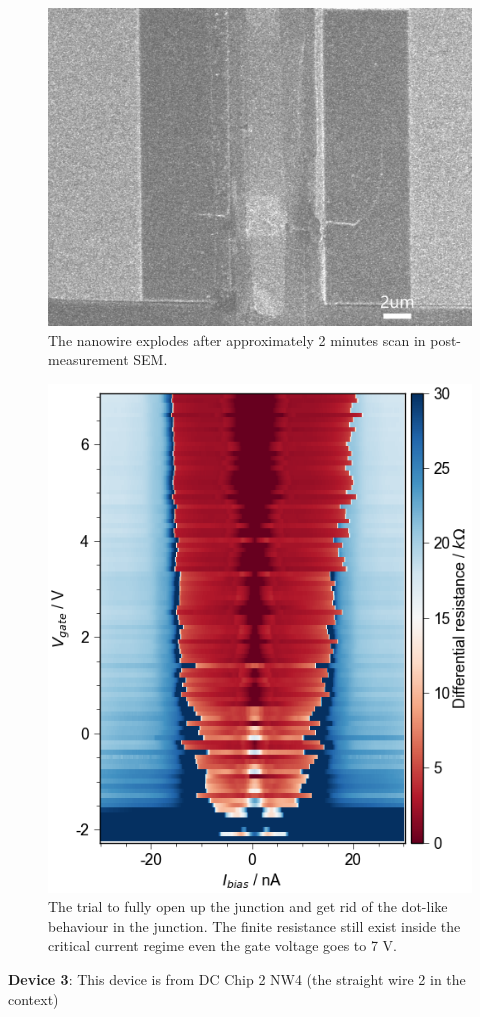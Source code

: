\begin{figure}[h!]
    \centering
    \includegraphics[width=0.7\linewidth]{Pic/NW2SEM.jpg}
    \caption{The nanowire explodes after approximately 2 minutes scan in post-measurement SEM.}
    \label{fig:my_label}
\end{figure}
\begin{figure}[h!]
    \centering
    \includegraphics[width=0.6\linewidth]{Pic/D2_Icup.png}
    \caption{The trial to fully open up the junction and get rid of the dot-like behaviour in the junction. The finite resistance still exist inside the critical current regime even the gate voltage goes to 7 V.}
    \label{fig:my_label}
\end{figure}
\clearpage
\noindent \textbf{Device 3}: This device is from DC Chip 2 NW4 (the straight wire 2 in the context)

